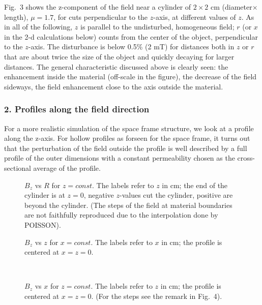 \documentclass[12pt]{article}
\def\?{$\spadesuit$}
\begin{document}
Fig.\ 3 shows the z-component of the field near a cylinder of $2\times
2$ cm (diameter$\times$length), $\mu=1.7$, for cuts perpendicular to
the $z$-axis, at different values of $z$. As in all of the following,
$z$ is parallel to the undisturbed, homogeneous field; $r$ (or $x$ in
the 2-d calculations below) counts from the center of the object,
perpendicular to the $z$-axis. The disturbance is below 0.5\% (2 mT)
for distances both in $z$ or $r$ that are about twice the size of the
object and quickly decaying for larger distances. The general
characteristic discussed above is clearly seen: the enhancement inside
the material (off-scale in the figure), the decrease of the field
sideways, the field enhancement close to the axis outside the
material.


\subsubsection*{2. Profiles along the field direction}

For a more realistic simulation of the space frame structure, we look at
a profile along the z-axis. For hollow profiles as forseen for the space
frame, it turns out that the perturbation of the field outside the
profile is well described by a full profile of the outer dimensions with
a constant permeability chosen as the cross-sectional average of the
profile.

\begin{figure}[h]
\begin{center}
\parbox{150mm}{
\caption{$B_z$ vs $R$ for $z=const$. The labels refer to $z$ in
cm; the end of the cylinder is at $z=0$, negative $z$-values cut the
cylinder, positive are beyond the cylinder. (The steps of the field at
material boundaries are not faithfully reproduced due to the
interpolation done by POISSON).}
}
\end{center} 
\end{figure}

\begin{figure}[p]
\begin{center}
\parbox{150mm}{
\caption{$B_z$ vs $z$ for $x=const$. The labels refer to $x$ in
cm; the profile is centered at $x=z=0$.}
}\\[20mm]
\parbox{150mm}{
\caption{$B_z$ vs $x$ for $z=const$. The labels refer to $z$ in
cm; the profile is centered at $x=z=0$. (For the steps see the remark in
Fig.\ 4).}
}
\end{center} 
\end{figure}
\end{document}
